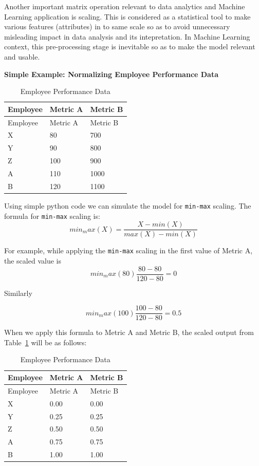 \documentclass[
  letterpaper,
  DIV=11,
  numbers=noendperiod]{scrreprt}
\theoremstyle{plain}
\theoremstyle{definition}
\theoremstyle{remark}
\begin{document}
Another important matrix operation relevant to data analytics and
Machine Learning application is scaling. This is considered as a
statistical tool to make various features (attributes) in to same scale
so as to avoid unnecessary misleading impact in data analysis and its
intepretation. In Machine Learning context, this pre-processing stage is
inevitable so as to make the model relevant and usable.

\textbf{Simple Example: Normalizing Employee Performance Data}

\begin{longtable}[]{@{}lll@{}}
\caption{Employee Performance Data}\label{tbl-EPD}\tabularnewline
\toprule\noalign{}
Employee & Metric A & Metric B \\
\midrule\noalign{}
\endfirsthead
\toprule\noalign{}
Employee & Metric A & Metric B \\
\midrule\noalign{}
\endhead
\bottomrule\noalign{}
\endlastfoot
X & 80 & 700 \\
Y & 90 & 800 \\
Z & 100 & 900 \\
A & 110 & 1000 \\
B & 120 & 1100 \\
\end{longtable}

Using simple python code we can simulate the model for \texttt{min-max}
scaling. The formula for \texttt{min-max} scaling is:
\[min_max(X)=\dfrac{X-min(X)}{max(X)-min(X)}\]

For example, while applying the \texttt{min-max} scaling in the first
value of Metric A, the scaled value is
\[min_max(80)\dfrac{80-80}{120-80}=0\]

Similarly

\[min_max(100)\dfrac{100-80}{120-80}=0.5\]

When we apply this formula to Metric A and Metric B, the scaled output
from Table~\ref{tbl-EPD} will be as follows:

\begin{longtable}[]{@{}lll@{}}
\caption{Employee Performance Data}\label{tbl-EPDu}\tabularnewline
\toprule\noalign{}
Employee & Metric A & Metric B \\
\midrule\noalign{}
\endfirsthead
\toprule\noalign{}
Employee & Metric A & Metric B \\
\midrule\noalign{}
\endhead
\bottomrule\noalign{}
\endlastfoot
X & 0.00 & 0.00 \\
Y & 0.25 & 0.25 \\
Z & 0.50 & 0.50 \\
A & 0.75 & 0.75 \\
B & 1.00 & 1.00 \\
\end{longtable}
\end{document}

